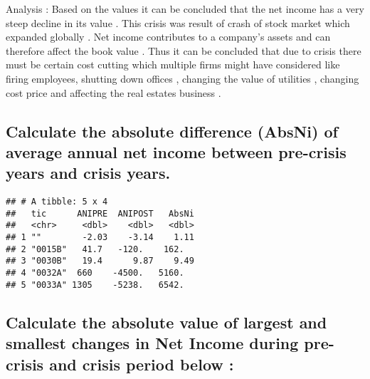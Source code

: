 \documentclass[
]{article}
\newenvironment{Shaded}{\begin{snugshade}}{\end{snugshade}}
\newcommand{\AttributeTok}[1]{\textcolor[rgb]{0.77,0.63,0.00}{#1}}
\newcommand{\DecValTok}[1]{\textcolor[rgb]{0.00,0.00,0.81}{#1}}
\newcommand{\FunctionTok}[1]{\textcolor[rgb]{0.00,0.00,0.00}{#1}}
\newcommand{\NormalTok}[1]{#1}
\newcommand{\OtherTok}[1]{\textcolor[rgb]{0.56,0.35,0.01}{#1}}
\newcommand{\SpecialCharTok}[1]{\textcolor[rgb]{0.00,0.00,0.00}{#1}}
\newcommand{\StringTok}[1]{\textcolor[rgb]{0.31,0.60,0.02}{#1}}
\begin{document}
Analysis : Based on the values it can be concluded that the net income
has a very steep decline in its value . This crisis was result of crash
of stock market which expanded globally . Net income contributes to a
company's assets and can therefore affect the book value . Thus it can
be concluded that due to crisis there must be certain cost cutting which
multiple firms might have considered like firing employees, shutting
down offices , changing the value of utilities , changing cost price and
affecting the real estates business .

\hypertarget{calculate-the-absolute-difference-absni-of-average-annual-net-income-between-pre-crisis-years-and-crisis-years.}{%
\subsection{Calculate the absolute difference (AbsNi) of average annual
net income between pre-crisis years and crisis
years.}\label{calculate-the-absolute-difference-absni-of-average-annual-net-income-between-pre-crisis-years-and-crisis-years.}}

\begin{Shaded}
\end{Shaded}

\begin{verbatim}
## # A tibble: 5 x 4
##   tic      ANIPRE  ANIPOST   AbsNi
##   <chr>     <dbl>    <dbl>   <dbl>
## 1 ""        -2.03    -3.14    1.11
## 2 "0015B"   41.7   -120.    162.  
## 3 "0030B"   19.4      9.87    9.49
## 4 "0032A"  660    -4500.   5160.  
## 5 "0033A" 1305    -5238.   6542.
\end{verbatim}

\hypertarget{calculate-the-absolute-value-of-largest-and-smallest-changes-in-net-income-during-pre--crisis-and-crisis-period-below}{%
\subsection{Calculate the absolute value of largest and smallest changes
in Net Income during pre- crisis and crisis period below
:}\label{calculate-the-absolute-value-of-largest-and-smallest-changes-in-net-income-during-pre--crisis-and-crisis-period-below}}
\end{document}
